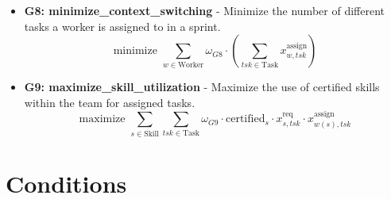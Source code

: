 \documentclass[11pt]{article}
\begin{document}
\begin{itemize}
    \item \textbf{G8: minimize\_context\_switching} - Minimize the number of different tasks a worker is assigned to in a sprint.
        \[ \text{minimize } \sum_{w \in \text{Worker}} \omega_{G8} \cdot \left( \sum_{tsk \in \text{Task}} x^{\text{assign}}_{w, tsk} \right) \]
    \item \textbf{G9: maximize\_skill\_utilization} - Maximize the use of certified skills within the team for assigned tasks.
        \[ \text{maximize } \sum_{s \in \text{Skill}} \sum_{tsk \in \text{Task}} \omega_{G9} \cdot \text{certified}_{s} \cdot x^{\text{req}}_{s, tsk} \cdot x^{\text{assign}}_{w(s), tsk} \]
\end{itemize}

\section{Conditions}
\end{document}
